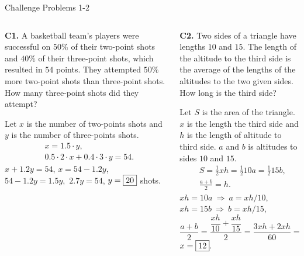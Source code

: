 \documentclass[9pt,aspectratio=169]{beamer}
\begin{document}
\begin{frame}{Challenge Problems 1-2}
  \begin{columns}[T]
    \begin{column}{0.5\textwidth}
      \begin{problem}
        \textbf{C1.} A basketball team's players were successful on $50\%$ of their two-point shots and $40\%$ of their three-point shots, which resulted in $54$ points. They attempted $50\%$ more two-point shots than three-point shots. How many three-point shots did they attempt?
      \end{problem}
      Let $x$ is the number of two-points shots and $y$ is the number of three-points shots.
      \begin{align*}
        &x = 1{.}5\cdot y,\\
        &0.5\cdot 2 \cdot x + 0.4\cdot 3 \cdot y = 54.
      \end{align*}
      $x + 1.2 y = 54$, $x = 54 - 1.2y$, $54 - 1.2 y = 1.5y,$ $2.7y = 54$, $y = \fbox{20}$ shots.
    \end{column}
    \begin{column}{0.5\textwidth}
      \begin{problem}
        \textbf{C2.} Two sides of a triangle have lengths $10$ and $15$. The length of the altitude to the third side is the average of the lengths of the altitudes to the two given sides. How long is the third side?
      \end{problem}
      Let $S$ is the area of the triangle. $x$ is the length the third side and $h$ is the length of altitude to third side. $a$ and $b$ is altitudes to sides $10$ and $15$.
      \begin{align*}
        &S = \frac{1}{2} xh = \frac{1}{2} 10a = \frac{1}{2} 15b,\\
        &\frac{a + b}{2} = h.
      \end{align*}
      $xh = 10a\ \Rightarrow\ a = xh/10$, $xh = 15b\ \Rightarrow\ b = xh/15$, 
      \[ \frac{a + b}{2} = \frac{\dfrac{xh}{10} + \dfrac{xh}{15}}{2} = \frac{3xh + 2xh}{60} = \frac{5xh}{60} = \frac{xh}{12} = h.\]
      $x = \fbox{12}.$  
    \end{column}
  \end{columns}
\end{frame}
\end{document}
